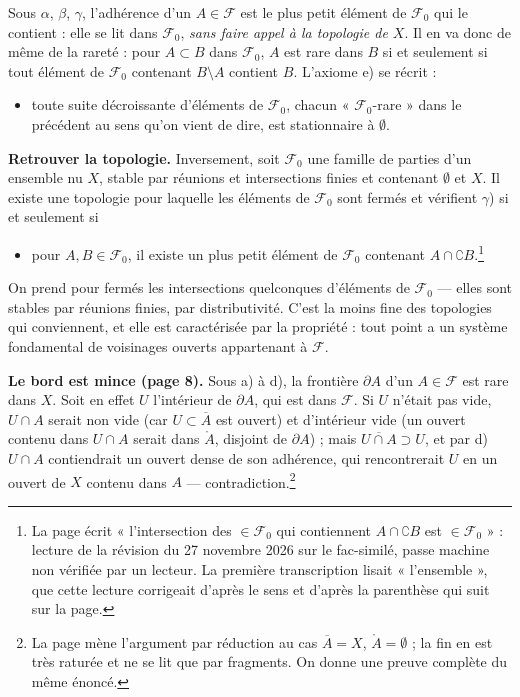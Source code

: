 \documentclass[11pt,a4paper]{article}
\begin{document}
Sous $\alpha$, $\beta$, $\gamma$, l'adhérence d'un $A \in \mathcal{F}$ est le
plus petit élément de $\mathcal{F}_0$ qui le contient : elle se lit dans
$\mathcal{F}_0$, \emph{sans faire appel à la topologie de $X$}. Il en va donc de
même de la rareté : pour $A \subset B$ dans $\mathcal{F}_0$, $A$ est rare dans
$B$ si et seulement si tout élément de $\mathcal{F}_0$ contenant $B \setminus A$
contient $B$. L'axiome e) se récrit :

\begin{itemize}
\item[$\varepsilon$)] toute suite décroissante d'éléments de
  $\mathcal{F}_0$, chacun « $\mathcal{F}_0$-rare » dans le précédent au sens
  qu'on vient de dire, est stationnaire à $\emptyset$.
\end{itemize}

\textbf{Retrouver la topologie.} Inversement, soit $\mathcal{F}_0$ une famille
de parties d'un ensemble nu $X$, stable par réunions et intersections finies et
contenant $\emptyset$ et $X$. Il existe une topologie pour laquelle les
éléments de $\mathcal{F}_0$ sont fermés et vérifient $\gamma$) si et seulement
si

\begin{itemize}
\item[$\gamma'$)] pour $A, B \in \mathcal{F}_0$, il existe un plus petit
  élément de $\mathcal{F}_0$ contenant $A \cap \complement B$.\footnote{La page
  écrit « l'intersection des $\in \mathcal{F}_0$ qui contiennent $A \cap
  \complement B$ est $\in \mathcal{F}_0$ » : lecture de la révision du 27
  novembre 2026 sur le fac-similé, passe machine non vérifiée par un lecteur.
  La première transcription lisait « l'ensemble », que cette lecture
  corrigeait d'après le sens et d'après la parenthèse qui suit sur la page.}
\end{itemize}

On prend pour fermés les intersections quelconques d'éléments de
$\mathcal{F}_0$ — elles sont stables par réunions finies, par distributivité.
C'est la moins fine des topologies qui conviennent, et elle est caractérisée
par la propriété : tout point a un système fondamental de voisinages ouverts
appartenant à $\mathcal{F}$.

\textbf{Le bord est mince (page 8).} Sous a) à d), la frontière $\partial A$
d'un $A \in \mathcal{F}$ est rare dans $X$. Soit en effet $U$ l'intérieur de
$\partial A$, qui est dans $\mathcal{F}$. Si $U$ n'était pas vide, $U \cap A$
serait non vide (car $U \subset \overline{A}$ est ouvert) et d'intérieur vide
(un ouvert contenu dans $U \cap A$ serait dans $\mathring{A}$, disjoint de
$\partial A$) ; mais $\overline{U \cap A} \supset U$, et par d) $U \cap A$
contiendrait un ouvert dense de son adhérence, qui rencontrerait $U$ en un
ouvert de $X$ contenu dans $A$ — contradiction.\footnote{La page mène
l'argument par réduction au cas $\overline{A} = X$, $\mathring{A} =
\emptyset$ ; la fin en est très raturée et ne se lit que par fragments. On
donne une preuve complète du même énoncé.}
\end{document}
